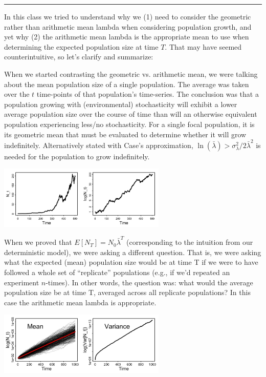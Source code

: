 \documentclass{article}
\begin{document}
\noindent{}

\rule[0.5ex]{\linewidth}{1pt}
In this class we tried to understand why we (1) need to consider the geometric rather than arithmetic mean lambda when considering population growth, and yet why (2) the arithmetic mean lambda is the appropriate mean to use when determining the expected population size at time $T$.  That may have seemed counterintuitive, so let's clarify and summarize:

When we started contrasting the geometric vs. arithmetic mean, we were talking about the
mean population size of a single population. The average was taken over the $t$ time-points of that population's time-series. The conclusion was that a population growing with (environmental) stochasticity will exhibit a lower average population size over the course of time than will an otherwise equivalent population experiencing less/no stochasticity. For a single focal population, it is its geometric mean that must be evaluated to determine whether it will grow indefinitely. Alternatively
stated with Case's approximation, $\ln (\bar{\lambda}) > \sigma_{\lambda}^2 / 2 \bar{\lambda}^2$ is needed for the population to grow indefinitely.

\begin{center}
\includegraphics[width=8cm]{figs/image0}
\end{center}

When we proved that $E[N_T]=N_0 \bar{\lambda}^T$ (corresponding to the intuition from our deterministic model), we were asking a different question. That is, we were asking what the expected (mean) population size would be at time T if we were to have followed a whole set of ``replicate'' populations (e.g., if we'd repeated an experiment $n$-times). In other words, the question was: what would the average population size be at time T, averaged across all replicate populations? In this case the arithmetic mean lambda is appropriate.

\begin{center}
 \includegraphics[width=8cm]{figs/image2}
\end{center}
\end{document}
